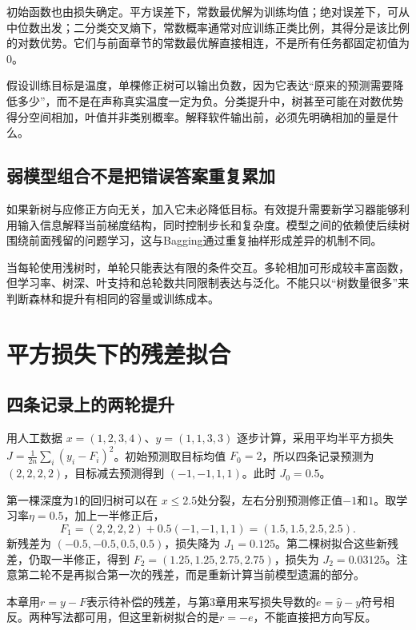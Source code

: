初始函数也由损失确定。平方误差下，常数最优解为训练均值；绝对误差下，可从中位数出发；二分类交叉熵下，常数概率通常对应训练正类比例，其得分是该比例的对数优势。它们与前面章节的常数最优解直接相连，不是所有任务都固定初值为0。

假设训练目标是温度，单棵修正树可以输出负数，因为它表达“原来的预测需要降低多少”，而不是在声称真实温度一定为负。分类提升中，树甚至可能在对数优势得分空间相加，叶值并非类别概率。解释软件输出前，必须先明确相加的量是什么。

\subsection{弱模型组合不是把错误答案重复累加}
如果新树与应修正方向无关，加入它未必降低目标。有效提升需要新学习器能够利用输入信息解释当前梯度结构，同时控制步长和复杂度。模型之间的依赖使后续树围绕前面残留的问题学习，这与Bagging通过重复抽样形成差异的机制不同。

当每轮使用浅树时，单轮只能表达有限的条件交互。多轮相加可形成较丰富函数，但学习率、树深、叶支持和总轮数共同限制表达与泛化。不能只以“树数量很多”来判断森林和提升有相同的容量或训练成本。

\section{平方损失下的残差拟合}

\subsection*{四条记录上的两轮提升}
用人工数据 $x=(1,2,3,4)$、$y=(1,1,3,3)$ 逐步计算，采用平均半平方损失 $J=\frac1{2n}\sum_i(y_i-F_i)^2$。初始预测取目标均值 $F_0=2$，所以四条记录预测为 $(2,2,2,2)$，目标减去预测得到 $(-1,-1,1,1)$。此时 $J_0=0.5$。

第一棵深度为1的回归树可以在 $x\leq2.5$处分裂，左右分别预测修正值$-1$和$1$。取学习率$\eta=0.5$，加上一半修正后，
\[
F_1=(2,2,2,2)+0.5(-1,-1,1,1)=(1.5,1.5,2.5,2.5).
\]
新残差为 $(-0.5,-0.5,0.5,0.5)$，损失降为 $J_1=0.125$。第二棵树拟合这些新残差，仍取一半修正，得到 $F_2=(1.25,1.25,2.75,2.75)$，损失为 $J_2=0.03125$。注意第二轮不是再拟合第一次的残差，而是重新计算当前模型遗漏的部分。


本章用$r=y-F$表示待补偿的残差，与第3章用来写损失导数的$e=\hat y-y$符号相反。两种写法都可用，但这里新树拟合的是$r=-e$，不能直接把方向写反。

